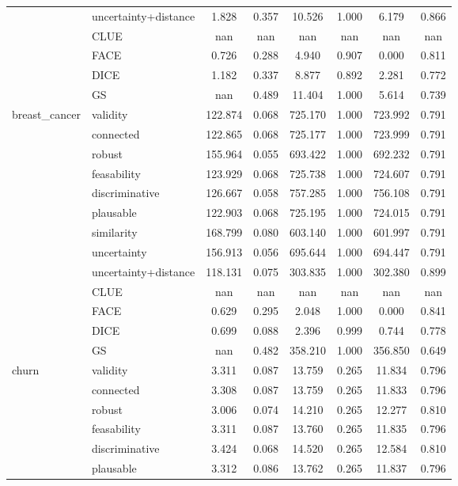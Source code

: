 \begin{table}[ht]
\begin{tabular}{l l c c c c c c}
 & uncertainty+distance & 1.828 & 0.357 & 10.526 & 1.000 & 6.179 & 0.866 \\ 
 & CLUE & nan & nan & nan & nan & nan & nan \\ 
 & FACE & 0.726 & 0.288 & 4.940 & 0.907 & 0.000 & 0.811 \\ 
 & DICE & 1.182 & 0.337 & 8.877 & 0.892 & 2.281 & 0.772 \\ 
 & GS & nan & 0.489 & 11.404 & 1.000 & 5.614 & 0.739 \\ 
\hline
\multirow{13}{*}{breast_cancer} & validity & 122.874 & 0.068 & 725.170 & 1.000 & 723.992 & 0.791 \\ 
 & connected & 122.865 & 0.068 & 725.177 & 1.000 & 723.999 & 0.791 \\ 
 & robust & 155.964 & 0.055 & 693.422 & 1.000 & 692.232 & 0.791 \\ 
 & feasability & 123.929 & 0.068 & 725.738 & 1.000 & 724.607 & 0.791 \\ 
 & discriminative & 126.667 & 0.058 & 757.285 & 1.000 & 756.108 & 0.791 \\ 
 & plausable & 122.903 & 0.068 & 725.195 & 1.000 & 724.015 & 0.791 \\ 
 & similarity & 168.799 & 0.080 & 603.140 & 1.000 & 601.997 & 0.791 \\ 
 & uncertainty & 156.913 & 0.056 & 695.644 & 1.000 & 694.447 & 0.791 \\ 
 & uncertainty+distance & 118.131 & 0.075 & 303.835 & 1.000 & 302.380 & 0.899 \\ 
 & CLUE & nan & nan & nan & nan & nan & nan \\ 
 & FACE & 0.629 & 0.295 & 2.048 & 1.000 & 0.000 & 0.841 \\ 
 & DICE & 0.699 & 0.088 & 2.396 & 0.999 & 0.744 & 0.778 \\ 
 & GS & nan & 0.482 & 358.210 & 1.000 & 356.850 & 0.649 \\ 
\hline
\multirow{13}{*}{churn} & validity & 3.311 & 0.087 & 13.759 & 0.265 & 11.834 & 0.796 \\ 
 & connected & 3.308 & 0.087 & 13.759 & 0.265 & 11.833 & 0.796 \\ 
 & robust & 3.006 & 0.074 & 14.210 & 0.265 & 12.277 & 0.810 \\ 
 & feasability & 3.311 & 0.087 & 13.760 & 0.265 & 11.835 & 0.796 \\ 
 & discriminative & 3.424 & 0.068 & 14.520 & 0.265 & 12.584 & 0.810 \\ 
 & plausable & 3.312 & 0.086 & 13.762 & 0.265 & 11.837 & 0.796 \\ 

\end{tabular}
\end{table}
